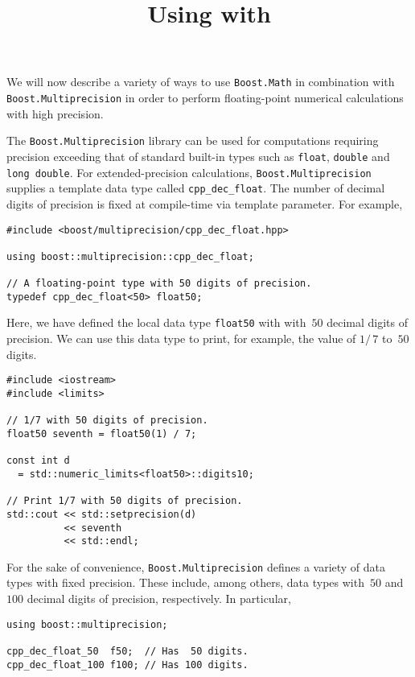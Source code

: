 \documentclass{article}[10pt]
\def\codedefault {\ttfamily}
\begin{document}
\title{Using {\codedefault{Boost.Math}} with {\codedefault{Boost.Multiprecision}}}
\maketitle

\noindent
We will now describe a variety of ways to use
\lstinline|Boost.Math| in combination with
\lstinline|Boost.Multiprecision|
in order to perform floating-point numerical calculations
with high precision.

The \lstinline|Boost.Multiprecision| library can be used
for computations requiring precision exceeding that
of standard built-in types such as
\lstinline|float|, \lstinline|double| and \lstinline|long double|.
For extended-precision calculations,
\lstinline|Boost.Multiprecision| supplies a template data
type called \lstinline|cpp_dec_float|.
The number of decimal digits of precision is fixed at compile-time
via template parameter. For example,

\begin{lstlisting}
#include <boost/multiprecision/cpp_dec_float.hpp>

using boost::multiprecision::cpp_dec_float;

// A floating-point type with 50 digits of precision.
typedef cpp_dec_float<50> float50;
\end{lstlisting}

Here, we have defined the local data type
\lstinline|float50| with with~$50$ decimal digits of
precision. We can use this data type to print, for example,
the value of $1/\,7$ to~$50$ digits.

\begin{lstlisting}
#include <iostream>
#include <limits>

// 1/7 with 50 digits of precision.
float50 seventh = float50(1) / 7;

const int d
  = std::numeric_limits<float50>::digits10;

// Print 1/7 with 50 digits of precision.
std::cout << std::setprecision(d)
          << seventh
          << std::endl;
\end{lstlisting}

For the sake of convenience, \lstinline|Boost.Multiprecision|
defines a variety of data types with fixed precision.
These include, among others, data types with~$50$ and~$100$
decimal digits of precision, respectively. In particular,

\begin{lstlisting}
using boost::multiprecision;

cpp_dec_float_50  f50;  // Has  50 digits.
cpp_dec_float_100 f100; // Has 100 digits.
\end{lstlisting}
\end{document}
